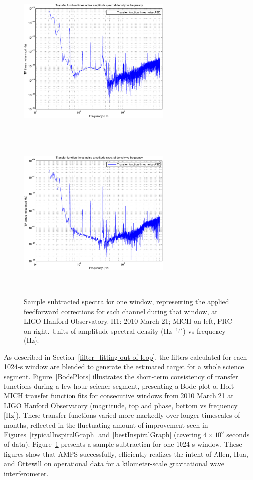 \begin{figure}
\begin{center}
\includegraphics[height=80mm, width=75mm]{figure5a.eps}
\includegraphics[height=80mm, width=75mm]{figure5b.eps}
\caption{Sample subtracted spectra for one window, representing the applied feedforward corrections for each channel during that window, at LIGO Hanford Observatory, H1: 2010 March 21; MICH on left, PRC on right. Units of amplitude spectral density (Hz$^{-1/2}$) vs frequency (Hz).}
\label{subtractedSpectrum}
\end{center}
\end{figure}

As described in Section~\ref{filter_fitting-out-of-loop}, the filters calculated for each 1024-s window are blended to generate the estimated target for a whole science segment. Figure~\ref{BodePlots} illustrates the short-term consistency of transfer functions during a few-hour science segment, presenting a Bode plot of Hoft-MICH transfer function fits for consecutive windows from 2010 March 21 at LIGO Hanford Observatory (magnitude, top and phase, bottom vs frequency [Hz]). These transfer functions varied more markedly over longer timescales of months, reflected in the fluctuating amount of improvement seen in Figures~\ref{typicalInspiralGraph} and~\ref{bestInspiralGraph} (covering $4\times10^6$ seconds of data). Figure~\ref{subtractedSpectrum} presents a sample subtraction for one 1024-s window. These figures show that AMPS successfully, efficiently realizes the intent of Allen, Hua, and Ottewill on operational data for a kilometer-scale gravitational wave interferometer.

